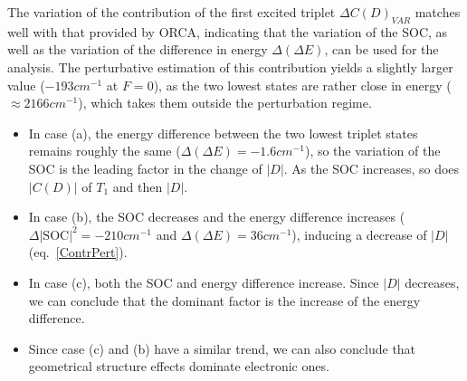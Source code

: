 \documentclass[12pt]{report}
\numberwithin{equation}{section}
\begin{document}
The variation of the contribution of the first excited triplet $\Delta C(D)_{VAR}$ matches well with that provided by ORCA, indicating that the variation of the SOC, as well as the variation of the difference in energy $\Delta (\Delta E)$, can be used for the analysis.
The perturbative estimation of this contribution yields a slightly larger value ($-193 cm^{-1}$ at $F=0$), as the two lowest states are rather close in energy ($\approx 2166 cm^{-1}$), which takes them outside the perturbation regime.
\begin{itemize}
\item In case (a), the energy difference between the two lowest triplet states remains roughly the same ($\Delta(\Delta E)=-1.6cm^{-1}$), so the variation of the SOC is the leading factor in the change of $|D|$. As the SOC increases, so does $|C(D)|$ of $T_1$ and then $|D|$.

\item In case (b), the SOC decreases and the energy difference increases ($\Delta|\text{SOC}|^2=-210cm^{-1}$ and $\Delta(\Delta E)=36cm^{-1}$), inducing a decrease of $|D|$ (eq.~\ref{ContrPert}).

\item In case (c), both the SOC and energy difference increase. Since $|D|$ decreases, we can conclude that the dominant factor is the increase of the energy difference.

\item Since case (c) and (b) have a similar trend, we can also conclude that geometrical structure effects dominate electronic ones.

\end{itemize}
\end{document}
